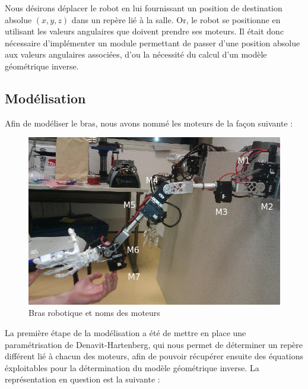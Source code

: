 Nous désirons déplacer le robot en lui fournissant un position de destination absolue $(x, y, z)$ dans un repère lié à la salle. Or, le robot se positionne en utilisant les valeurs angulaires que doivent prendre ses moteurs. Il était donc nécessaire d'implémenter un module permettant de passer d'une position absolue aux valeurs angulaires associées, d'ou la nécessité du calcul d'un modèle géométrique inverse.

\subsection{Modélisation}

Afin de modéliser le bras, nous avons nommé les moteurs de la façon suivante :\\

\begin{figure}[!htc]
	\begin{center}
		\includegraphics[scale=0.6]{images/robot1.jpg}
		\caption{Bras robotique et noms des moteurs} 
		\label{general}
	\end{center}
\end{figure}

La première étape de la modélisation a été de mettre en place une paramétrisation de Denavit-Hartenberg, qui nous permet de déterminer un repère différent lié à chacun des moteurs, afin de pouvoir récupérer ensuite des équations éxploitables pour la détermination du modèle géométrique inverse.
\newpage
La représentation en question est la suivante :\\

